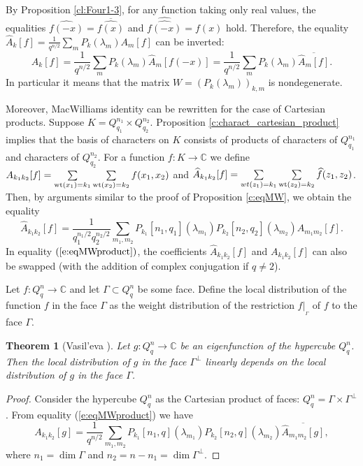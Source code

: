 \documentclass[11pt]{article}
\newtheorem{theorem}{Theorem}[section]
\theoremstyle{definition}
\newcommand{\wt}{{\rm wt}}
\begin{document}
{{{By Proposition \ref{cl:Four1-3}, for any function taking only real values, the equalities $\widehat{f(-x)}=\overline{\widehat{f(x)}}$ and $\widehat{\widehat{f(-x)}}=f(x)$ hold. Therefore, the equality $\widehat{A}_k[f]= \frac{1}{q^{n/2}}\sum\limits_m P_k(\lambda_m)A_m[f]$ can be inverted:
$${A}_k[f]= \frac{1}{q^{n/2}}\sum\limits_m P_k(\lambda_m)\widehat{A}_m[f(-x)]=\frac{1}{q^{n/2}}\sum\limits_m P_k(\lambda_m)\overline{\widehat{A}_m[f]}.$$
In particular it means that the matrix $W=(P_k(\lambda_m))_{k,m}$ is nondegenerate.

Moreover, MacWilliams identity can be rewritten for the case of Cartesian products.
Suppose $K=Q^{n_1}_{q_1}\times Q^{n_2}_{q_2}$.  Proposition \ref{c:charact_cartesian_product} implies that the basis of characters on $K$ consists of products of characters of $Q^{n_1}_{q_1}$ and characters of $Q^{n_2}_{q_2}$. For a function $f:K\rightarrow \mathbb{C}$ we define $A_{k_1k_2}[f]=\sum\limits_{\wt(x_1)=k_1}\sum\limits_{\wt(x_2)=k_2}f(x_1,x_2)$ and $\widehat{A}_{k_1k_2}[f]=\sum\limits_{wt(z_1)=k_1}\sum\limits_{\wt(z_2)=k_2}\widehat{f}(z_1,z_2)$. Then, by  arguments 
 similar to the proof of Proposition \ref{c:eqMW}, we obtain the equality
\begin{equation}\label{e:eqMWproduct}
 \widehat{A}_{k_1k_2}[f]=
\frac{1}{q_1^{n_1/2}q_2^{n_2/2}}\sum\limits_{m_1,m_2}
P_{k_1}[n_1,q_1](\lambda_{m_1})P_{k_2}[n_2,q_2](\lambda_{m_2})A_{m_1m_2}[f].
\end{equation}
In equality $(\ref{e:eqMWproduct})$, the coefficients $\widehat{A}_{k_1k_2}[f]$ and ${A}_{k_1k_2}[f]$ can also be swapped (with the addition of complex conjugation if $q\neq 2$).

Let $f:Q^n_q\rightarrow \mathbb{C}$ and let $\Gamma\subset Q^n_q$ be some face. Define the local distribution of the function $f$ in the face $\Gamma$ as the weight distribution of the restriction $f|_{_\Gamma}$ of $f$ to the face $\Gamma$.


\begin{theorem}[Vasil'eva \cite{Vas09}]\label{th:Vas}
Let $g:Q^n_q\rightarrow \mathbb{C}$ be an eigenfunction of the hypercube $Q^n_q$. Then the local distribution of $g$ in the face $\Gamma^\perp$ linearly depends on the local distribution of $g$ in the face $\Gamma$.
\end{theorem}
\begin{proof}
Consider the hypercube $Q^n_q$ as the Cartesian product of faces: $Q^n_q=\Gamma\times \Gamma^\perp$. From equality (\ref{e:eqMWproduct}) we have
$$ A_{k_1k_2}[g]=
\frac{1}{q^{n/2}}\sum\limits_{m_1,m_2}
P_{k_1}[n_1,q](\lambda_{m_1})P_{k_2}[n_2,q](\lambda_{m_2})
\overline{\widehat{A}_{m_1m_2}[g]},$$ where $n_1=\dim \Gamma$ and $n_2=n-n_1=\dim\Gamma^\perp$.


\end{proof}}}}
\end{document}
